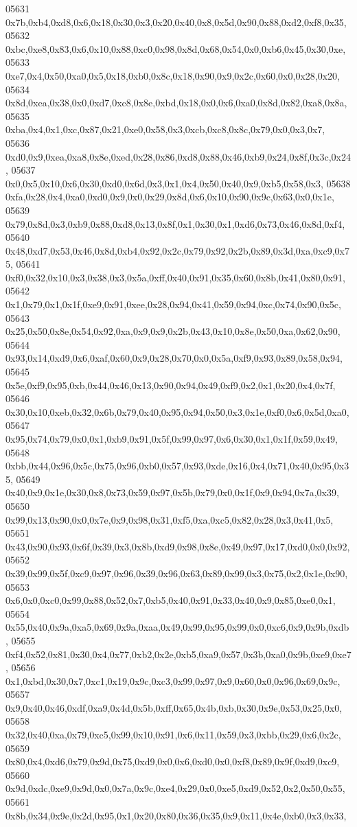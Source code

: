 \begin{DoxyCode}
05631   0x7b,0xb4,0xd8,0x6,0x18,0x30,0x3,0x20,0x40,0x8,0x5d,0x90,0x88,0xd2,0xf8,0x35,
05632   0xbc,0xe8,0x83,0x6,0x10,0x88,0xc0,0x98,0x8d,0x68,0x54,0x0,0xb6,0x45,0x30,0xe,
05633   0xe7,0x4,0x50,0xa0,0x5,0x18,0xb0,0x8c,0x18,0x90,0x9,0x2c,0x60,0x0,0x28,0x20,
05634   0x8d,0xea,0x38,0x0,0xd7,0xc8,0x8e,0xbd,0x18,0x0,0x6,0xa0,0x8d,0x82,0xa8,0x8a,
05635   0xba,0x4,0x1,0xc,0x87,0x21,0xe0,0x58,0x3,0xcb,0xc8,0x8c,0x79,0x0,0x3,0x7,
05636   0xd0,0x9,0xea,0xa8,0x8e,0xed,0x28,0x86,0xd8,0x88,0x46,0xb9,0x24,0x8f,0x3c,0x24,
05637   0x0,0x5,0x10,0x6,0x30,0xd0,0x6d,0x3,0x1,0x4,0x50,0x40,0x9,0xb5,0x58,0x3,
05638   0xfa,0x28,0x4,0xa0,0xd0,0x9,0x0,0x29,0x8d,0x6,0x10,0x90,0x9c,0x63,0x0,0x1e,
05639   0x79,0x8d,0x3,0xb9,0x88,0xd8,0x13,0x8f,0x1,0x30,0x1,0xd6,0x73,0x46,0x8d,0xf4,
05640   0x48,0xd7,0x53,0x46,0x8d,0xb4,0x92,0x2c,0x79,0x92,0x2b,0x89,0x3d,0xa,0xc9,0x75,
05641   0xf0,0x32,0x10,0x3,0x38,0x3,0x5a,0xff,0x40,0x91,0x35,0x60,0x8b,0x41,0x80,0x91,
05642   0x1,0x79,0x1,0x1f,0xe9,0x91,0xee,0x28,0x94,0x41,0x59,0x94,0xc,0x74,0x90,0x5c,
05643   0x25,0x50,0x8e,0x54,0x92,0xa,0x9,0x9,0x2b,0x43,0x10,0x8e,0x50,0xa,0x62,0x90,
05644   0x93,0x14,0xd9,0x6,0xaf,0x60,0x9,0x28,0x70,0x0,0x5a,0xf9,0x93,0x89,0x58,0x94,
05645   0x5e,0xf9,0x95,0xb,0x44,0x46,0x13,0x90,0x94,0x49,0xf9,0x2,0x1,0x20,0x4,0x7f,
05646   0x30,0x10,0xeb,0x32,0x6b,0x79,0x40,0x95,0x94,0x50,0x3,0x1e,0xf0,0x6,0x5d,0xa0,
05647   0x95,0x74,0x79,0x0,0x1,0xb9,0x91,0x5f,0x99,0x97,0x6,0x30,0x1,0x1f,0x59,0x49,
05648   0xbb,0x44,0x96,0x5c,0x75,0x96,0xb0,0x57,0x93,0xde,0x16,0x4,0x71,0x40,0x95,0x35,
05649   0x40,0x9,0x1e,0x30,0x8,0x73,0x59,0x97,0x5b,0x79,0x0,0x1f,0x9,0x94,0x7a,0x39,
05650   0x99,0x13,0x90,0x0,0x7e,0x9,0x98,0x31,0xf5,0xa,0xc5,0x82,0x28,0x3,0x41,0x5,
05651   0x43,0x90,0x93,0x6f,0x39,0x3,0x8b,0xd9,0x98,0x8e,0x49,0x97,0x17,0xd0,0x0,0x92,
05652   0x39,0x99,0x5f,0xc9,0x97,0x96,0x39,0x96,0x63,0x89,0x99,0x3,0x75,0x2,0x1e,0x90,
05653   0x6,0x0,0xc0,0x99,0x88,0x52,0x7,0xb5,0x40,0x91,0x33,0x40,0x9,0x85,0xe0,0x1,
05654   0x55,0x40,0x9a,0xa5,0x69,0x9a,0xaa,0x49,0x99,0x95,0x99,0x0,0xc6,0x9,0x9b,0xdb,
05655   0xf4,0x52,0x81,0x30,0x4,0x77,0xb2,0x2e,0xb5,0xa9,0x57,0x3b,0xa0,0x9b,0xe9,0xe7,
05656   0x1,0xbd,0x30,0x7,0xc1,0x19,0x9c,0xc3,0x99,0x97,0x9,0x60,0x0,0x96,0x69,0x9c,
05657   0x9,0x40,0x46,0xdf,0xa9,0x4d,0x5b,0xff,0x65,0x4b,0xb,0x30,0x9e,0x53,0x25,0x0,
05658   0x32,0x40,0xa,0x79,0xc5,0x99,0x10,0x91,0x6,0x11,0x59,0x3,0xbb,0x29,0x6,0x2c,
05659   0x80,0x4,0xd6,0x79,0x9d,0x75,0xd9,0x0,0x6,0xd0,0x0,0xf8,0x89,0x9f,0xd9,0xc9,
05660   0x9d,0xdc,0xe9,0x9d,0x0,0x7a,0x9c,0xe4,0x29,0x0,0xe5,0xd9,0x52,0x2,0x50,0x55,
05661   0x8b,0x34,0x9e,0x2d,0x95,0x1,0x20,0x80,0x36,0x35,0x9,0x11,0x4e,0xb0,0x3,0x33,

\end{DoxyCode}
